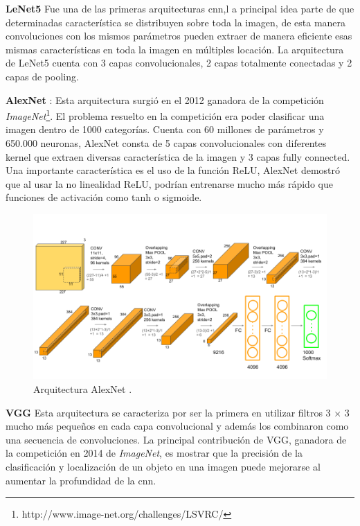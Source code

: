 \par \textbf{LeNet5} \citep{lenet} Fue una de las primeras arquitecturas \ac{cnn},l a principal idea parte de que determinadas característica se distribuyen sobre toda la imagen, de esta manera convoluciones con los mismos parámetros pueden extraer de manera eficiente esas mismas características en toda la imagen en múltiples locación. La arquitectura de LeNet5 cuenta con 3 capas convolucionales, 2 capas totalmente conectadas y 2 capas de pooling.

\par \textbf{AlexNet} \citep{alexnet}: Esta arquitectura surgió en el 2012 ganadora de la competición \textit{ImageNet}\footnote{http://www.image-net.org/challenges/LSVRC/}. El problema resuelto en la competición era poder clasificar una imagen dentro de 1000 categorías. Cuenta con 60 millones de parámetros y 650.000 neuronas, AlexNet consta de 5 capas convolucionales con diferentes kernel que extraen diversas característica de la imagen  y 3 capas fully connected. Una importante característica es el uso de la función ReLU,  AlexNet demostró que al usar la no linealidad ReLU,  podrían entrenarse mucho más rápido que  funciones de activación como  tanh o sigmoide.

\begin{figure}[H]
 \centering
  \includegraphics[scale=0.3,keepaspectratio=true,clip=true]{imagenes/MarcoTeorico/AlexNet-1.png}
  \caption{Arquitectura AlexNet \citep{alexnet}.}
	\label{Fig:alexnet}
\end{figure}


\par \textbf{VGG} \citep{vgg} Esta arquitectura se caracteriza por ser la primera en utilizar filtros 3 × 3 mucho más pequeños en cada capa convolucional y además los combinaron como una secuencia de convoluciones. La principal contribución de VGG, ganadora de la competición en 2014 de \textit{ImageNet}, es mostrar que la precisión de la clasificación y localización de un objeto en una imagen puede mejorarse al aumentar la profundidad de la \ac{cnn}.

